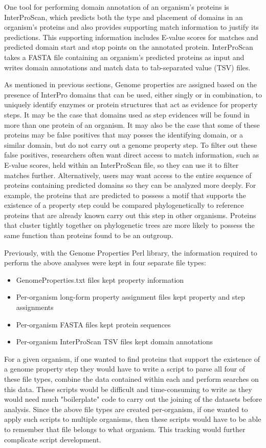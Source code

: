 One tool for performing domain annotation of an organism's proteins is InterProScan, which predicts both the type and placement of domains in an organism's proteins and also provides supporting match information to justify its predictions. This supporting information includes E-value scores for matches and predicted domain start and stop points on the annotated protein. InterProScan takes a FASTA file \cite{pearson19905} containing an organism's predicted proteins as input and writes domain annotations and match data to tab-separated value (TSV) files.

As mentioned in previous sections, Genome properties are assigned based on the presence of InterPro domains that can be used, either singly or in combination, to uniquely identify enzymes or protein structures that act as evidence for property steps. It may be the case that domains used as step evidences will be found in more than one protein of an organism. It may also be the case that some of these proteins may be false positives that may posses the identifying domain, or a similar domain, but do not carry out a genome property step. To filter out these false positives, researchers often want direct access to match information, such as E-value scores, held within an InterProScan file, so they can use it to filter matches further. Alternatively, users may want access to the entire sequence of proteins containing predicted domains so they can be analyzed more deeply. For example, the proteins that are predicted to possess a motif that supports the existence of a property step could be compared phylogenetically to reference proteins that are already known carry out this step in other organisms. Proteins that cluster tightly together on phylogenetic trees are more likely to possess the same function than proteins found to be an outgroup.

Previously, with the Genome Properties Perl library, the information required to perform the above analyses were kept in four separate file types: 
\begin{itemize}
\item GenomeProperties.txt files kept property information
\item Per-organism long-form property assignment files kept property and step assignments
\item Per-organism FASTA files \cite{pearson19905} kept protein sequences 
\item  Per-organism InterProScan TSV files kept domain annotations 
\end{itemize}
For a given organism, if one wanted to find proteins that support the existence of a genome property step they would have to write a script to parse all four of these file types, combine the data contained within each and perform searches on this data. These scripts would be difficult and time-consuming to write as they would need much "boilerplate" code to carry out the joining of the datasets before analysis. Since the above file types are created per-organism, if one wanted to apply such scripts to multiple organisms, then these scripts would have to be able to remember that file belongs to what organism. This tracking would further complicate script development.

